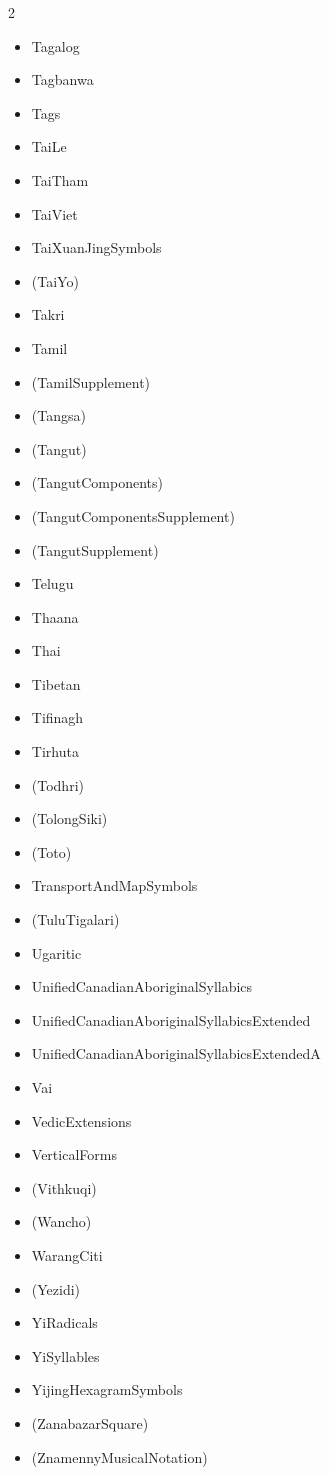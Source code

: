 \documentclass{article}
\newenvironment{itemlist}{%
  \begin{itemize}
  \setlength{\itemsep}{0pt}
  \setlength{\parsep}{0pt}
  \setlength{\topsep}{0pt}
  \setlength{\partopsep}{0pt}
  \setlength{\parskip}{0pt}
  \setlength{\labelsep}{5pt}}%
{
  \end{itemize}}
\begin{document}
\begin{multicols*}{2}
\begin{itemlist}
        \item Tagalog
        \item Tagbanwa
        \item Tags
        \item TaiLe
        \item TaiTham
        \item TaiViet
        \item TaiXuanJingSymbols
        \item (TaiYo)
        \item Takri
        \item Tamil
        \item (TamilSupplement)
        \item (Tangsa)
        \item (Tangut)
        \item (TangutComponents)
        \item (TangutComponentsSupplement)
        \item (TangutSupplement)
        \item Telugu
        \item Thaana
        \item Thai
        \item Tibetan
        \item Tifinagh
        \item Tirhuta
        \item (Todhri)
        \item (TolongSiki)
        \item (Toto)
        \item TransportAndMapSymbols
        \item (TuluTigalari)
        \item Ugaritic
        \item UnifiedCanadianAboriginalSyllabics
        \item UnifiedCanadianAboriginalSyllabicsExtended
        \item UnifiedCanadianAboriginalSyllabicsExtendedA
        \item Vai
        \item VedicExtensions
        \item VerticalForms
        \item (Vithkuqi)
        \item (Wancho)
        \item WarangCiti
        \item (Yezidi)
        \item YiRadicals
        \item YiSyllables
        \item YijingHexagramSymbols
        \item (ZanabazarSquare)
        \item (ZnamennyMusicalNotation)
      \end{itemlist}
    \end{multicols*}
\end{document}
